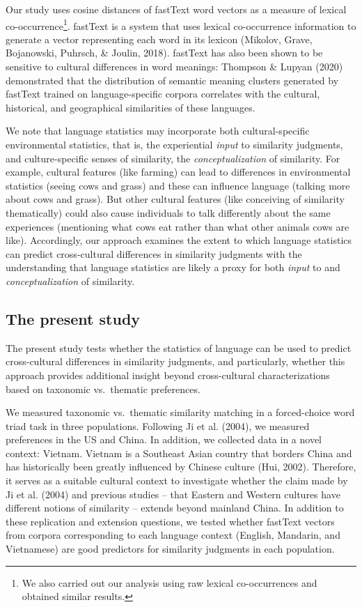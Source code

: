 \documentclass[10pt, letterpaper]{article}
\begin{document}
Our study uses cosine distances of fastText word vectors as a measure of
lexical co-occurrence\footnote{We also carried out our analysis using
  raw lexical co-occurrences and obtained similar results.}. fastText is
a system that uses lexical co-occurrence information to generate a
vector representing each word in its lexicon (Mikolov, Grave,
Bojanowski, Puhrsch, \& Joulin, 2018). fastText has also been shown to
be sensitive to cultural differences in word meanings: Thompson \&
Lupyan (2020) demonstrated that the distribution of semantic meaning
clusters generated by fastText trained on language-specific corpora
correlates with the cultural, historical, and geographical similarities
of these languages.

We note that language statistics may incorporate both cultural-specific
environmental statistics, that is, the experiential \emph{input} to
similarity judgments, and culture-specific senses of similarity, the
\emph{conceptualization} of similarity. For example, cultural features
(like farming) can lead to differences in environmental statistics
(seeing cows and grass) and these can influence language (talking more
about cows and grass). But other cultural features (like conceiving of
similarity thematically) could also cause individuals to talk
differently about the same experiences (mentioning what cows eat rather
than what other animals cows are like). Accordingly, our approach
examines the extent to which language statistics can predict
cross-cultural differences in similarity judgments with the
understanding that language statistics are likely a proxy for both
\emph{input} to and \emph{conceptualization} of similarity.

\hypertarget{the-present-study}{%
\subsection{The present study}\label{the-present-study}}

The present study tests whether the statistics of language can be used
to predict cross-cultural differences in similarity judgments, and
particularly, whether this approach provides additional insight beyond
cross-cultural characterizations based on taxonomic vs.~thematic
preferences.

We measured taxonomic vs.~thematic similarity matching in a
forced-choice word triad task in three populations. Following Ji et al.
(2004), we measured preferences in the US and China. In addition, we
collected data in a novel context: Vietnam. Vietnam is a Southeast Asian
country that borders China and has historically been greatly influenced
by Chinese culture (Hui, 2002). Therefore, it serves as a suitable
cultural context to investigate whether the claim made by Ji et al.
(2004) and previous studies -- that Eastern and Western cultures have
different notions of similarity -- extends beyond mainland China. In
addition to these replication and extension questions, we tested whether
fastText vectors from corpora corresponding to each language context
(English, Mandarin, and Vietnamese) are good predictors for similarity
judgments in each population.
\end{document}
